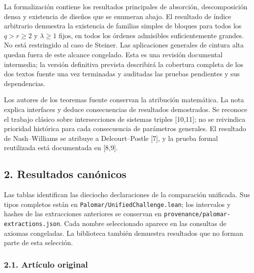 \documentclass[spanish,11pt,a4paper]{article}
\begin{document}
La formalización contiene los resultados principales de absorción, descomposición densa y existencia de diseños que se enumeran abajo. El resultado de índice arbitrario demuestra la existencia de familias simples de bloques para todos los \(q>r\ge2\) y \(\lambda\ge1\) fijos, en todos los órdenes admisibles suficientemente grandes. No está restringido al caso de Steiner. Las aplicaciones generales de cintura alta quedan fuera de este alcance congelado. Esta es una revisión documental intermedia; la versión definitiva prevista describirá la cobertura completa de los dos textos fuente una vez terminadas y auditadas las pruebas pendientes y sus dependencias.

Los autores de los teoremas fuente conservan la atribución matemática. La nota explica interfaces y deduce consecuencias de resultados demostrados. Se reconoce el trabajo clásico sobre intersecciones de sistemas triples {[}10,11{]}; no se reivindica prioridad histórica para cada consecuencia de parámetros generales. El resultado de Nash--Williams se atribuye a Delcourt--Postle {[}7{]}, y la prueba formal reutilizada está documentada en {[}8,9{]}.

\subsection{2. Resultados canónicos}\label{resultados-canuxf3nicos}

Las tablas identifican las dieciocho declaraciones de la comparación unificada. Sus tipos completos están en \texttt{Palomar/\allowbreak{}Unified\allowbreak{}Challenge.\allowbreak{}lean}; los intervalos y hashes de las extracciones anteriores se conservan en \texttt{provenance/\allowbreak{}palomar-extractions.\allowbreak{}json}. Cada nombre seleccionado aparece en las consultas de axiomas congeladas. La biblioteca también demuestra resultados que no forman parte de esta selección.


\subsubsection{2.1. Artículo original}\label{artuxedculo-original}
\end{document}
